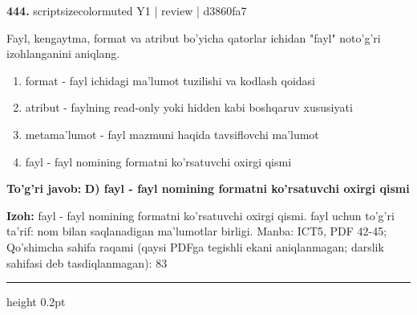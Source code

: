 \documentclass[10pt,a4paper]{article}
\begin{document}
{\bfseries\sffamily\color{ink} 444.} {scriptsizecolor{muted} Y1 | review | d3860fa7}
\par
Fayl, kengaytma, format va atribut bo'yicha qatorlar ichidan "fayl" noto'g'ri izohlanganini aniqlang.
\begin{enumerate}[label=\Alph*),leftmargin=9mm]
\item format - fayl ichidagi ma'lumot tuzilishi va kodlash qoidasi
\item atribut - faylning read-only yoki hidden kabi boshqaruv xususiyati
\item metama'lumot - fayl mazmuni haqida tavsiflovchi ma'lumot
\item fayl - fayl nomining formatni ko'rsatuvchi oxirgi qismi
\end{enumerate}
\begin{tcolorbox}[enhanced,breakable,colback=teal!4,colframe=teal!60!black,boxrule=0.45pt,arc=1.2mm,left=2.7mm,right=2.7mm,top=1.8mm,bottom=1.8mm,before skip=2mm,after skip=2mm]
{\bfseries\sffamily\color{teal}To'g'ri javob:} \textbf{D) fayl - fayl nomining formatni ko'rsatuvchi oxirgi qismi}
\par\smallskip
{\bfseries Izoh:} fayl - fayl nomining formatni ko'rsatuvchi oxirgi qismi. fayl uchun to'g'ri ta'rif: nom bilan saqlanadigan ma'lumotlar birligi. Manba: ICT5, PDF 42-45; Qo'shimcha sahifa raqami (qaysi PDFga tegishli ekani aniqlanmagan; darslik sahifasi deb tasdiqlanmagan): 83
\end{tcolorbox}
\vspace{2mm}\hrule height 0.2pt\vspace{3mm}
\end{document}

